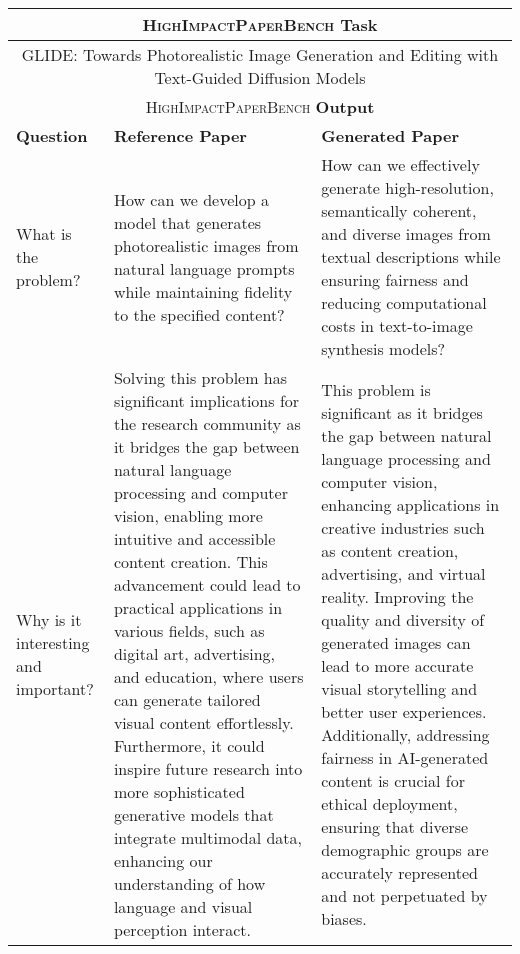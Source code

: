 \begin{table*}[htbp]
\centering
\scriptsize
\begin{tabular}{p{3cm}p{6cm}p{6cm}}
\toprule[1.1pt]
\multicolumn{3}{c}{\textsc{HighImpactPaperBench} \textbf{Task}} \\ \midrule
\multicolumn{3}{c}{GLIDE: Towards Photorealistic Image Generation and Editing with Text-Guided Diffusion Models} \\ \midrule
\multicolumn{3}{c}{\textsc{HighImpactPaperBench} \textbf{Output}} \\ \midrule
\textbf{Question} & \textbf{Reference Paper} & \textbf{Generated Paper} \\ \midrule
What is the problem? & 
How can we develop a model that generates photorealistic images from natural language prompts while maintaining fidelity to the specified content? &
How can we effectively generate high-resolution, semantically coherent, and diverse images from textual descriptions while ensuring fairness and reducing computational costs in text-to-image synthesis models? \\ \midrule

Why is it interesting and important? & 
Solving this problem has significant implications for the research community as it bridges the gap between natural language processing and computer vision, enabling more intuitive and accessible content creation. This advancement could lead to practical applications in various fields, such as digital art, advertising, and education, where users can generate tailored visual content effortlessly. Furthermore, it could inspire future research into more sophisticated generative models that integrate multimodal data, enhancing our understanding of how language and visual perception interact. &
This problem is significant as it bridges the gap between natural language processing and computer vision, enhancing applications in creative industries such as content creation, advertising, and virtual reality. Improving the quality and diversity of generated images can lead to more accurate visual storytelling and better user experiences. Additionally, addressing fairness in AI-generated content is crucial for ethical deployment, ensuring that diverse demographic groups are accurately represented and not perpetuated by biases.
\\ \midrule


\end{tabular}
\end{table*}
